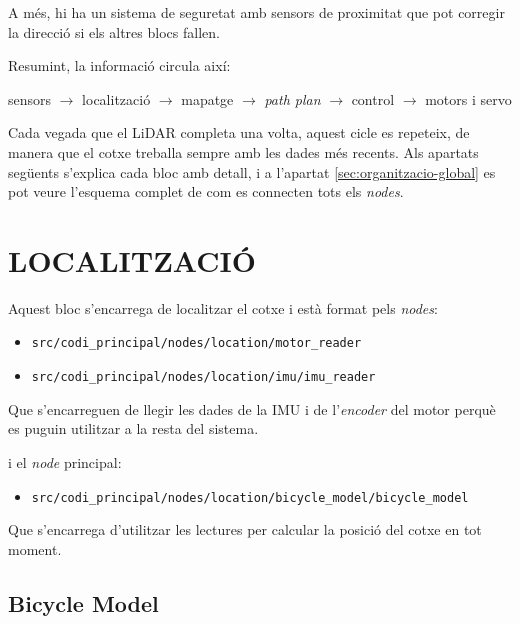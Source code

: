 \documentclass[11pt,a4paper]{article}
\let\origsection\section
\renewcommand{\section}{\clearpage\origsection}
\begin{document}
A més, hi ha un sistema de seguretat amb sensors de proximitat que pot corregir la direcció si els altres blocs fallen.

Resumint, la informació circula així:
\nopagebreak

\begin{center}
  sensors $\rightarrow$ localització $\rightarrow$ mapatge $\rightarrow$ \emph{path plan} $\rightarrow$ control $\rightarrow$ motors i servo
\end{center}

Cada vegada que el LiDAR completa una volta, aquest cicle es repeteix, de manera que el cotxe treballa sempre amb les dades més recents. Als apartats següents s’explica cada bloc amb detall, i a l’apartat \ref{sec:organitzacio-global} es pot veure l’esquema complet de com es connecten tots els \emph{nodes}.

\section{LOCALITZACIÓ}

Aquest bloc s’encarrega de localitzar el cotxe i està format pels \emph{nodes}:
\nopagebreak

\begin{itemize}
  \item \texttt{src/\allowbreak{}codi\_\allowbreak{}principal/\allowbreak{}nodes/\allowbreak{}location/\allowbreak{}motor\_\allowbreak{}reader}
  \item \texttt{src/\allowbreak{}codi\_\allowbreak{}principal/\allowbreak{}nodes/\allowbreak{}location/\allowbreak{}imu/\allowbreak{}imu\_\allowbreak{}reader}
\end{itemize}

Que s'encarreguen de llegir les dades de la IMU i de l'\emph{encoder} del motor perquè es puguin utilitzar a la resta del sistema.

i el \emph{node} principal:
\nopagebreak

\begin{itemize}
  \item \texttt{src/\allowbreak{}codi\_\allowbreak{}principal/\allowbreak{}nodes/\allowbreak{}location/\allowbreak{}bicycle\_\allowbreak{}model/\allowbreak{}bicycle\_\allowbreak{}model}
\end{itemize}

Que s'encarrega d'utilitzar les lectures per calcular la posició del cotxe en tot moment.

\subsection{Bicycle Model}\label{sec:bicycle-model}
\end{document}
